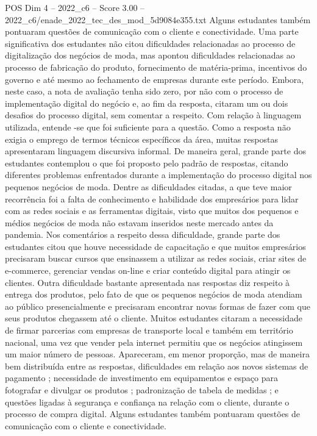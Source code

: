 \begin{textsample}{POS Dim 4 – 2022\_c6 – Score 3.00 – 2022\_c6/enade\_2022\_tec\_des\_mod\_5d9084e355.txt}
Alguns estudantes também pontuaram questões de comunicação com o cliente e conectividade.
Uma parte significativa dos estudantes não citou dificuldades relacionadas ao processo de digitalização dos negócios de moda, mas apontou dificuldades relacionadas ao processo de fabricação do produto, fornecimento de matéria-prima, incentivos do governo e até mesmo ao fechamento de empresas durante este período.
Embora, neste caso, a nota de avaliação tenha sido zero, por não com o processo de implementação digital do negócio e, ao fim da resposta, citaram um ou dois desafios do processo digital, sem comentar a respeito.
Com relação à linguagem utilizada, entende -se que foi suficiente para a questão.
Como a resposta não exigia o emprego de termos técnicos específicos da área, muitas respostas apresentaram linguagem discursiva informal.
De maneira geral, grande parte dos estudantes contemplou o que foi proposto pelo padrão de respostas, citando diferentes problemas enfrentados durante a implementação do processo digital nos pequenos negócios de moda.
Dentre as dificuldades citadas, a que teve maior recorrência foi a falta de conhecimento e habilidade dos empresários para lidar com as redes sociais e as ferramentas digitais, visto que muitos dos pequenos e médios negócios de moda não estavam inseridos neste mercado antes da pandemia.
Nos comentários a respeito dessa dificuldade, grande parte dos estudantes citou que houve necessidade de capacitação e que muitos empresários precisaram buscar cursos que ensinassem a utilizar as redes sociais, criar sites de e-commerce, gerenciar vendas on-line e criar conteúdo digital para atingir os clientes.
Outra dificuldade bastante apresentada nas respostas diz respeito à entrega dos produtos, pelo fato de que os pequenos negócios de moda atendiam ao público presencialmente e precisaram encontrar novas formas de fazer com que seus produtos chegassem até o cliente.
Muitos estudantes citaram a necessidade de firmar parcerias com empresas de transporte local e também em território nacional, uma vez que vender pela internet permitiu que os negócios atingissem um maior número de pessoas.
Apareceram, em menor proporção, mas de maneira bem distribuída entre as respostas, dificuldades em relação aos novos sistemas de pagamento ; necessidade de investimento em equipamentos e espaço para fotografar e divulgar os produtos ; padronização de tabela de medidas ; e questões ligadas à segurança e confiança na relação com o cliente, durante o processo de compra digital.
Alguns estudantes também pontuaram questões de comunicação com o cliente e conectividade.

\end{textsample}
